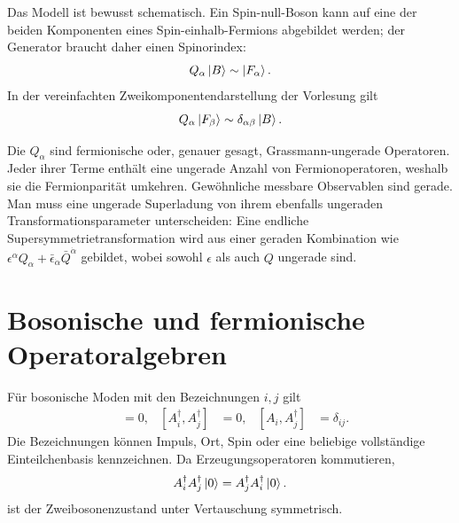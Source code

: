 Das Modell ist bewusst schematisch. Ein Spin-null-Boson kann auf eine der beiden Komponenten eines Spin-einhalb-Fermions abgebildet werden; der Generator braucht daher einen Spinorindex:
\begin{equation}
Q_\alpha\left\lvert B\right\rangle\sim\left\lvert F_\alpha\right\rangle.
\end{equation}
In der vereinfachten Zweikomponentendarstellung der Vorlesung gilt
\begin{equation}
Q_\alpha\left\lvert F_\beta\right\rangle\sim\delta_{\alpha\beta}\left\lvert B\right\rangle.
\end{equation}

\begin{classroomqa}
\end{classroomqa}

Die \(Q_\alpha\) sind fermionische oder, genauer gesagt, Grassmann-ungerade Operatoren. Jeder ihrer Terme enthält eine ungerade Anzahl von Fermionoperatoren, weshalb sie die Fermionparität umkehren. Gewöhnliche messbare Observablen sind gerade. Man muss eine ungerade Superladung von ihrem ebenfalls ungeraden Transformationsparameter unterscheiden: Eine endliche Supersymmetrietransformation wird aus einer geraden Kombination wie \(\epsilon^\alpha Q_\alpha+\bar\epsilon_{\dot\alpha}\bar Q^{\dot\alpha}\) gebildet, wobei sowohl \(\epsilon\) als auch \(Q\) ungerade sind. 

\section{Bosonische und fermionische Operatoralgebren}

Für bosonische Moden mit den Bezeichnungen \(i,j\) gilt
\begin{align}
[A_i,A_j]&=0,&
[A_i^\dagger,A_j^\dagger]&=0,&
[A_i,A_j^\dagger]&=\delta_{ij}.
\end{align}
Die Bezeichnungen können Impuls, Ort, Spin oder eine beliebige vollständige Einteilchenbasis kennzeichnen. Da Erzeugungsoperatoren kommutieren,
\begin{equation}
A_i^\dagger A_j^\dagger\left\lvert0\right\rangle
=A_j^\dagger A_i^\dagger\left\lvert0\right\rangle.
\end{equation}
ist der Zweibosonenzustand unter Vertauschung symmetrisch.

